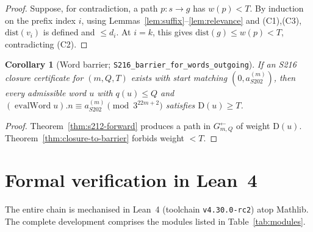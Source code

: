 \documentclass[11pt,a4paper]{article}
\theoremstyle{plain}
\newtheorem{corollary}[theorem]{Corollary}
\theoremstyle{definition}
\newcommand{\aSat}{a_{S202}^{(m)}}
\newcommand{\defect}{\mathrm{D}}
\newcommand{\InvG}{G^{\!\leftarrow}}
\DeclareMathOperator{\evalWord}{evalWord}
\begin{document}
\begin{proof}
Suppose, for contradiction, a path $p : s \to g$ has $w(p) < T$. By
induction on the prefix index $i$, using
Lemmas~\ref{lem:suffix}--\ref{lem:relevance} and (C1),(C3),
$\mathrm{dist}(v_i)$ is defined and $\le d_i$. At $i = k$, this gives
$\mathrm{dist}(g) \le w(p) < T$, contradicting (C2).
\end{proof}

\begin{corollary}[Word barrier; \texttt{S216\_barrier\_for\_words\_outgoing}]\label{cor:word-barrier}
If an S216 closure certificate for $(m, Q, T)$ exists with start
matching $(0, \aSat)$, then every admissible word $u$ with
$q(u) \le Q$ and $(\evalWord u).n \equiv \aSat \pmod{3^{22m+2}}$
satisfies $\defect(u) \ge T$.
\end{corollary}

\begin{proof}
Theorem~\ref{thm:s212-forward} produces a path in $\InvG_{m,Q}$ of
weight $\defect(u)$. Theorem~\ref{thm:closure-to-barrier} forbids
weight $< T$.
\end{proof}

\section{Formal verification in Lean~4}\label{sec:lean}

The entire chain is mechanised in Lean~4 (toolchain \texttt{v4.30.0-rc2})
atop Mathlib. The complete development comprises the modules listed in
Table~\ref{tab:modules}.
\end{document}
